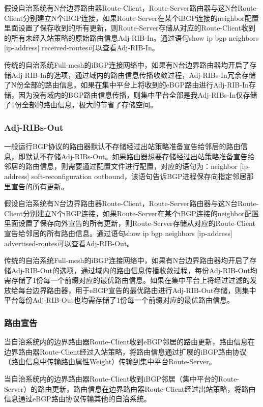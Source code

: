 假设自治系统有N台边界路由器Route-Client，Route-Server路由器与这N台Route-Client分别建立N个iBGP连接，如果Route-Server在某个iBGP连接的neighbor配置里面设置了保存收到的所有更新，则Route-Server存储从对应的Route-Client收到的所有未经入站策略的原始路由信息Adj-RIB-In。通过语句show ip bgp neighbors [ip-address] received-routes可以查看Adj-RIB-In。

传统的自治系统Full-mesh的iBGP连接网络中，如果有N台边界路由器均开启了存储Adj-RIB-In的选项，通过域内的路由信息传播收敛过程，Adj-RIBs-In冗余存储了N份全部的路由信息。如果在集中平台上将收到的eBGP路由进行Adj-RIB-In存储，因为没有域内的BGP路由信息传播，则集中平台全部是我Adj-RIBs-In仅存储了1份全部的路由信息，极大的节省了存储空间。


\subsubsection{Adj-RIBs-Out}
一般运行BGP协议的路由器默认不存储经过出站策略准备宣告给邻居的路由信息，即默认不存储Adj-RIBs-Out。如果路由器想要存储经过出站策略准备宣告给邻居的路由信息，则需要通过配置文件进行配置，对应的语句为：neighbor [ip-address] soft-reconfiguration outbound，该语句告诉BGP进程保存向指定邻居那里宣告的所有更新。


假设自治系统有N台边界路由器Route-Client，Route-Server路由器与这N台Route-Client分别建立N个iBGP连接，如果Route-Server在某个iBGP连接的neighbor配置里面设置了保存向外宣告的所有更新，则Route-Server存储从对应的Route-Client宣告给邻居的所有路由信息。通过语句show ip bgp neighbors [ip-address] advertised-routes可以查看Adj-RIB-Out。

传统的自治系统Full-mesh的iBGP连接网络中，如果有N台边界路由器均开启了存储Adj-RIB-Out的选项，通过域内的路由信息传播收敛过程，每份Adj-RIB-Out均需存储了1份每一个前缀对应的最优路由信息。如果在集中平台上将经过过滤的发放给每台边界路由器，用于eBGP宣告的最优路由进行Adj-RIB-Out存储，则集中平台每份Adj-RIB-Out也均需存储了1份每一个前缀对应的最优路由信息。


\subsubsection{路由宣告}

当自治系统内的边界路由器Route-Client收到eBGP邻居的路由更新，路由信息在边界路由器Route-Client经过入站策略，将路由信息通过扩展的iBGP路由协议（路由信息中传输路由属性Weight）传输到集中平台Route-Server。

当自治系统内的边界路由器Route-Client收到iBGP邻居（集中平台的Route-Server）的路由更新，路由信息在边界路由器Route-Client经过出站策略，将路由信息通过eBGP路由协议传输其他的自治系统。

